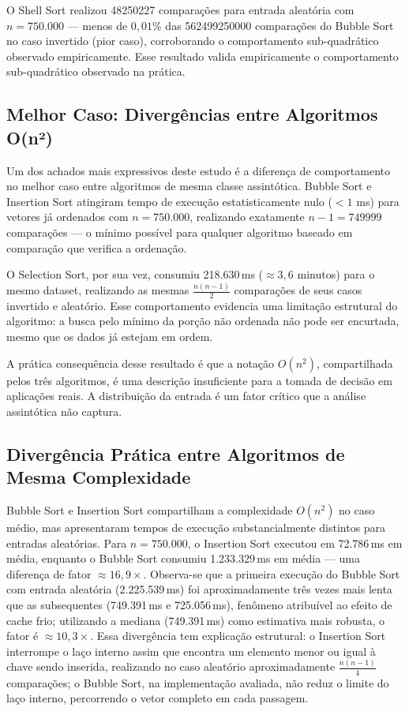 \documentclass[12pt]{article}
\newcommand{\num}[1]{#1}
\begin{document}
O Shell Sort realizou \num{48250227}
comparações para entrada aleatória com $n = 750.000$ — menos
de $0,01\%$ das \num{562499250000} comparações do Bubble Sort
no caso invertido (pior caso), corroborando o comportamento
sub-quadrático observado empiricamente. Esse resultado valida empiricamente o
comportamento sub-quadrático observado na prática.

\subsection{Melhor Caso: Divergências entre Algoritmos O(n²)}

Um dos achados mais expressivos deste estudo é a diferença de
comportamento no melhor caso entre algoritmos de mesma classe
assintótica. Bubble Sort e Insertion Sort atingiram tempo de
execução estatisticamente nulo ($< 1$ ms) para vetores já
ordenados com $n = 750.000$, realizando exatamente $n - 1 =
\num{749999}$ comparações — o mínimo possível para qualquer
algoritmo baseado em comparação que verifica a ordenação.

O Selection Sort, por sua vez, consumiu 218.630\,ms
($\approx 3,6$ minutos) para o mesmo dataset, realizando as mesmas
$\frac{n(n-1)}{2}$ comparações de seus casos invertido e
aleatório. Esse comportamento evidencia uma limitação estrutural
do algoritmo: a busca pelo mínimo da porção não ordenada não
pode ser encurtada, mesmo que os dados já estejam em ordem.

A prática consequência desse resultado é que a notação $O(n^2)$,
compartilhada pelos três algoritmos, é uma descrição insuficiente
para a tomada de decisão em aplicações reais. A distribuição da
entrada é um fator crítico que a análise assintótica não captura.

\subsection{Divergência Prática entre Algoritmos de Mesma Complexidade}

Bubble Sort e Insertion Sort compartilham a complexidade
$O(n^2)$ no caso médio, mas apresentaram tempos de execução
substancialmente distintos para entradas aleatórias.
Para $n = 750.000$, o Insertion Sort executou em
72.786\,ms em média, enquanto o Bubble Sort
consumiu 1.233.329\,ms em média — uma diferença de fator
$\approx 16{,}9\times$. Observa-se que a primeira execução do
Bubble Sort com entrada aleatória (2.225.539\,ms) foi
aproximadamente três vezes mais lenta que as subsequentes
(749.391\,ms e 725.056\,ms), fenômeno atribuível ao efeito
de cache frio; utilizando a mediana (749.391\,ms) como
estimativa mais robusta, o fator é $\approx 10{,}3\times$.
Essa divergência tem explicação estrutural:
o Insertion Sort interrompe o laço interno assim que encontra
um elemento menor ou igual à chave sendo inserida, realizando
no caso aleatório aproximadamente $\frac{n(n-1)}{4}$ comparações;
o Bubble Sort, na implementação avaliada, não reduz o limite
do laço interno, percorrendo o vetor completo em cada passagem.
\end{document}
